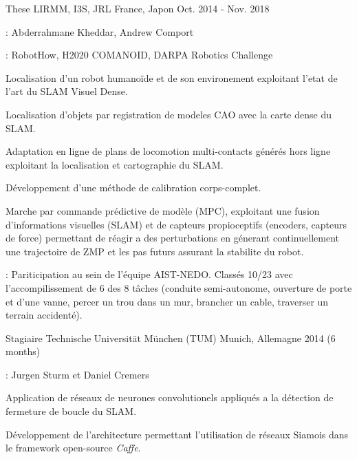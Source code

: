 \begin{cventries}
  \cventry
    {These} %
    {LIRMM, I3S, JRL} %
    {France, Japon} %
    {Oct. 2014 - Nov. 2018} %
    {
      \begin{cvitems} %
        \item {}: Abderrahmane Kheddar, Andrew Comport 
        \item {}: RobotHow, H2020 COMANOID, DARPA Robotics Challenge
        \item Localisation d'un robot humanoïde et de son environement exploitant l'etat de l'art du SLAM Visuel Dense.
        \item Localisation d'objets par registration de modeles CAO avec la carte dense du SLAM.
        \item Adaptation en ligne de plans de locomotion multi-contacts générés hors ligne exploitant la localisation et cartographie du SLAM.
        \item Développement d'une méthode de calibration corps-complet. 
        \item Marche par commande prédictive de modèle (MPC), exploitant une fusion d'informations visuelles (SLAM) et de capteurs propioceptifs (encoders, capteurs de force) permettant de réagir a des perturbations en génerant continuellement une trajectoire de ZMP et les pas futurs assurant la stabilite du robot.
        \item {}: Pariticipation au sein de l'équipe AIST-NEDO. Classés 10/23 avec l'accompilissement de 6 des 8 tâches (conduite semi-autonome, ouverture de porte et d'une vanne, percer un trou dans un mur, brancher un cable, traverser un terrain accidenté).
      \end{cvitems}
    }

  \cventry
    {Stagiaire} %
    {Technische Universität München (TUM)} %
    {Munich, Allemagne} %
    {2014 (6 months)} %
    {
      \begin{cvitems} %
        \item {}: Jurgen Sturm et Daniel Cremers
        \item Application de réseaux de neurones convolutionels appliqués a la détection de fermeture de boucle du SLAM.
        \item Développement de l'architecture permettant l'utilisation de réseaux Siamois dans le framework open-source \emph{Caffe}.
      \end{cvitems}
    }


\end{cventries}

